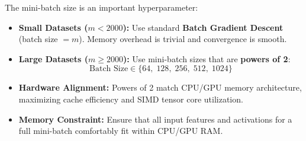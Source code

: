 \documentclass[10pt,a4paper]{article}
\begin{document}
\vspace{-6pt}

\begin{tcolorbox}[
    colframe=themeblue, colback=lightbg, coltitle=white,
    fonttitle=\bfseries\sffamily\small,
    title={Practical Rules for Mini-Batch Sizing},
    arc=1.3mm, boxrule=0.5pt, left=5pt, right=5pt, top=2pt, bottom=2pt
]
\footnotesize
The mini-batch size is an important hyperparameter:
\begin{itemize}[leftmargin=8pt, itemsep=1pt, topsep=0pt]
    \item \textbf{Small Datasets ($m < 2000$):} Use standard \textbf{Batch Gradient Descent} (batch size $= m$). Memory overhead is trivial and convergence is smooth.
    \item \textbf{Large Datasets ($m \ge 2000$):} Use mini-batch sizes that are \textbf{powers of 2}:
    \[
    \text{Batch Size} \in \{64, \; 128, \; 256, \; 512, \; 1024\}
    \]
    \item \textbf{Hardware Alignment:} Powers of 2 match CPU/GPU memory architecture, maximizing cache efficiency and SIMD tensor core utilization.
    \item \textbf{Memory Constraint:} Ensure that all input features and activations for a full mini-batch comfortably fit within CPU/GPU RAM.
\end{itemize}
\end{tcolorbox}

\vspace{-2pt}
\end{document}
